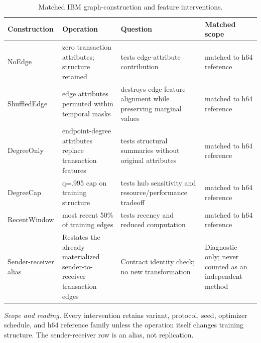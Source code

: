 \begin{table}[tbp]
\centering
\footnotesize
\setlength{\tabcolsep}{3.2pt}
\renewcommand{\arraystretch}{1.12}
\caption{Matched IBM graph-construction and feature interventions.}
\label{tab:s-construction-cards}
\begin{tabularx}{\textwidth}{@{}>{\raggedright\arraybackslash}p{} Y Y >{\raggedright\arraybackslash}p{0.20\textwidth}@{}}
\toprule
\textbf{Construction} & \textbf{Operation} & \textbf{Question} & \textbf{Matched scope} \\
\midrule
NoEdge & zero transaction attributes; structure retained & tests edge-attribute contribution & matched to h64 reference \\
ShuffledEdge & edge attributes permuted within temporal masks & destroys edge-feature alignment while preserving marginal values & matched to h64 reference \\
DegreeOnly & endpoint-degree attributes replace transaction features & tests structural summaries without original attributes & matched to h64 reference \\
DegreeCap & q=.995 cap on training structure & tests hub sensitivity and resource/performance tradeoff & matched to h64 reference \\
RecentWindow & most recent 50\% of training edges & tests recency and reduced computation & matched to h64 reference \\
Sender-receiver alias & Restates the already materialized sender-to-receiver transaction edges & Contract identity check; no new transformation & Diagnostic only; never counted as an independent method \\
\bottomrule
\end{tabularx}
\vspace{2pt}
\begin{minipage}{\textwidth}\footnotesize\emph{Scope and reading.} Every intervention retains variant, protocol, seed, optimizer schedule, and h64 reference family unless the operation itself changes training structure. The sender-receiver row is an alias, not replication.\end{minipage}
\end{table}
